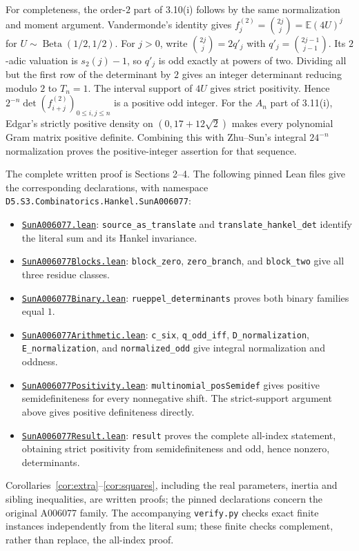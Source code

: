 \documentclass[11pt]{article}
\newcommand{\leanbase}{https://github.com/the-omega-institute/trureturing/blob/42aeb4e95344fb1ea9d2042d02ff1a5589faaacb/D5/S3/Combinatorics/Hankel/}
\begin{document}
\normalsize
For completeness, the order-$2$ part of 3.10(i) follows by the same
normalization and moment argument. Vandermonde's identity gives
$f_j^{(2)}=\binom{2j}j=\mathbb E(4U)^j$ for
$U\sim\operatorname{Beta}(1/2,1/2)$. For $j>0$, write
$\binom{2j}j=2q'_j$ with $q'_j=\binom{2j-1}{j-1}$.
Its $2$-adic valuation is $s_2(j)-1$, so $q'_j$ is odd exactly at
powers of two. Dividing all but the first row of the determinant by
$2$ gives an integer determinant reducing modulo $2$ to $T_n=1$.
The interval support of $4U$ gives strict positivity. Hence
$2^{-n}\det(f_{i+j}^{(2)})_{0\leq i,j\leq n}$ is a positive odd integer.
For the $A_n$ part of 3.11(i), Edgar's strictly positive density on
$(0,17+12\sqrt2)$ makes every polynomial Gram matrix positive definite.
Combining this with Zhu--Sun's integral $24^{-n}$ normalization proves
the positive-integer assertion for that sequence.

The complete written proof is Sections 2--4. The following pinned Lean
files give the corresponding declarations, with namespace
\texttt{D5.S3.Combinatorics.Hankel.SunA006077}:
\begin{itemize}
\raggedright
\item \href{\leanbase SunA006077.lean}{\texttt{SunA006077.lean}}:
\texttt{source\_as\_translate} and \texttt{translate\_hankel\_det}
identify the literal sum and its Hankel invariance.
\item \href{\leanbase SunA006077Blocks.lean}{\texttt{SunA006077Blocks.lean}}:
\texttt{block\_zero}, \texttt{zero\_branch}, and \texttt{block\_two}
give all three residue classes.
\item \href{\leanbase SunA006077Binary.lean}{\texttt{SunA006077Binary.lean}}:
\texttt{rueppel\_determinants} proves both binary families equal $1$.
\item \href{\leanbase SunA006077Arithmetic.lean}{\texttt{SunA006077Arithmetic.lean}}:
\texttt{c\_six}, \texttt{q\_odd\_iff}, \texttt{D\_normalization},
\texttt{E\_normalization}, and \texttt{normalized\_odd} give integral
normalization and oddness.
\item \href{\leanbase SunA006077Positivity.lean}{\texttt{SunA006077Positivity.lean}}:
\texttt{multinomial\_posSemidef} gives positive semidefiniteness for every
nonnegative shift. The strict-support argument above gives positive
definiteness directly.
\item \href{\leanbase SunA006077Result.lean}{\texttt{SunA006077Result.lean}}:
\texttt{result} proves the complete all-index statement, obtaining strict
positivity from semidefiniteness and odd, hence nonzero, determinants.
\end{itemize}
Corollaries~\ref{cor:extra}--\ref{cor:squares}, including the real
parameters, inertia and sibling inequalities, are written proofs;
the pinned declarations concern the original A006077 family.
The accompanying
\texttt{verify.py} checks exact finite instances independently from the
literal sum; these finite checks complement, rather than replace, the
all-index proof.
\end{document}
